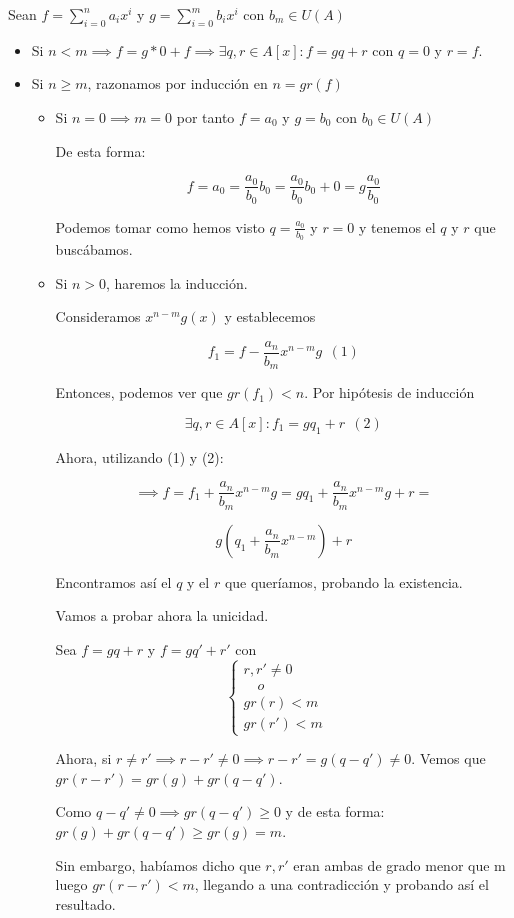 \documentclass[11pt, a4paper, titlepage]{article}
\makeatletter
\renewenvironment{proof}[1][\proofname] {\vspace{-15pt}\par\pushQED{\qed}\normalfont\topsep6\p@\@plus6\p@\relax\trivlist\item[\hskip\labelsep\it#1\@addpunct{.}]\ignorespaces}{\popQED\endtrivlist\@endpefalse}
\theoremstyle{theorem-style}
\theoremstyle{definition-style}
\theoremstyle{remark-style}
\theoremstyle{example-style}
\makeatother
\begin{document}
\begin{proof}
	
	Sean $f = \sum_{i=0}^n a_i x^i$ y $g = \sum_{i=0}^m b_i x^i$ con $b_m \in U(A)$
	
	\begin{itemize}
	
	\item Si $n< m \implies f = g * 0 + f \implies \exists q,r\in A[x] : f = gq+r$ con $q=0$ y $r = f$.
	
	\item Si $n\geq m$, razonamos por inducción en $n=gr(f)$
	\begin{itemize}
	
	\item Si $n=0 \implies m = 0$ por tanto $f=a_0$ y $g=b_0$ con $b_0 \in U(A)$
	
	De esta forma:
	
	\[
	f = a_0 = \frac{a_0}{b_0}b_0 = \frac{a_0}{b_0}b_0 + 0 = g\frac{a_0}{b_0}
	\]
	
	Podemos tomar como hemos visto $q=\frac{a_0}{b_0}$ y $r=0$ y tenemos el $q$ y $r$ que buscábamos.
	
	\item Si $n> 0$, haremos la inducción.
	
	  Consideramos $x^{n-m}g(x)$ y establecemos

          $$f_1 = f - \frac{a_n}{b_m}x^{n-m}g\ \ (1)$$
	
	  Entonces, podemos ver que $gr(f_1) < n$. Por hipótesis de inducción

          $$ \exists q,r \in A[x] : f_1 = gq_1 + r \ \ (2)$$
	
	Ahora, utilizando (1) y (2):
	
	 \[
	 \implies f = f_1 +\frac{a_n}{b_m}x^{n-m}g = gq_1 + \frac{a_n}{b_m}x^{n-m}g +r = 
	 \]
	 
	 \[
	 g\left(q_1 + \frac{a_n}{b_m}x^{n-m}\right) + r
	 \]
	
	Encontramos así el $q$ y el $r$ que queríamos, probando la existencia.
	
	Vamos a probar ahora la unicidad.
	
	Sea $f=gq+r$ y $f= gq' +r'$ con
	\[
    \begin{cases}
		 r,r' \neq 0\\
		  \quad o \\
 gr(r) < m 
 \\ gr(r') < m
		   
\end{cases}
	\quad
	\]
	
	Ahora, si $r\neq r'\implies r-r' \neq 0 \implies r-r' = g(q-q') \neq 0$.
	Vemos que $gr(r-r') = gr(g)+ gr(q-q')$.
	
 Como $q-q' \neq 0 \implies gr(q-q') \geq 0 $ y de esta forma: $gr(g)+ gr(q-q') \geq gr(g) = m$.
 
 Sin embargo, habíamos dicho que $r,r'$ eran ambas de grado menor que m luego $gr(r-r') < m$, llegando a una contradicción y probando así el resultado.
\end{itemize} 
	
	
\end{itemize}
\end{proof}
\end{document}
